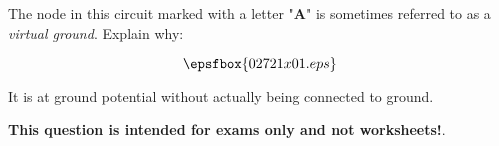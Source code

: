 

The node in this circuit marked with a letter "{\bf A}" is sometimes referred to as a {\it virtual ground}.  Explain why:

$$\epsfbox{02721x01.eps}$$







It is at ground potential without actually being connected to ground.







{\bf This question is intended for exams only and not worksheets!}.




